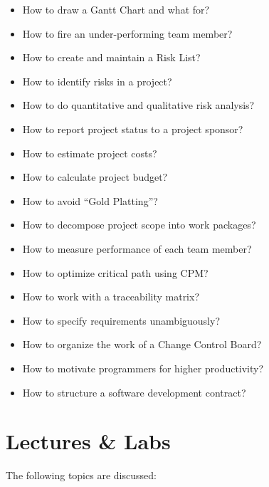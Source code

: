 \documentclass[nobrand,anonymous,nodate,nosecurity]{huawei}
\begin{document}
\begin{itemize}
\item How to draw a Gantt Chart and what for?
\item How to fire an under-performing team member?
\item How to create and maintain a Risk List?
\item How to identify risks in a project?
\item How to do quantitative and qualitative risk analysis?
\item How to report project status to a project sponsor?
\item How to estimate project costs?
\item How to calculate project budget?
\item How to avoid ``Gold Platting''?
\item How to decompose project scope into work packages?
\item How to measure performance of each team member?
\item How to optimize critical path using CPM?
\item How to work with a traceability matrix?
\item How to specify requirements unambiguously?
\item How to organize the work of a Change Control Board?
\item How to motivate programmers for higher productivity?
\item How to structure a software development contract?
\end{itemize}

\newpage
\section*{Lectures \& Labs}

The following topics are discussed:
\end{document}
